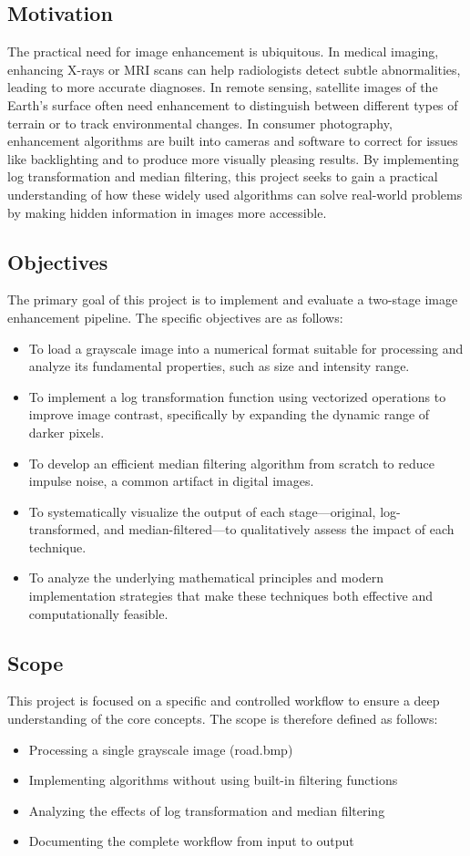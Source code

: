 \documentclass[12pt,a4paper]{article}
\begin{document}
\subsection{Motivation}
The practical need for image enhancement is ubiquitous. In medical imaging, enhancing X-rays or MRI scans can help radiologists detect subtle abnormalities, leading to more accurate diagnoses. In remote sensing, satellite images of the Earth's surface often need enhancement to distinguish between different types of terrain or to track environmental changes. In consumer photography, enhancement algorithms are built into cameras and software to correct for issues like backlighting and to produce more visually pleasing results. By implementing log transformation and median filtering, this project seeks to gain a practical understanding of how these widely used algorithms can solve real-world problems by making hidden information in images more accessible.


\subsection{Objectives}
The primary goal of this project is to implement and evaluate a two-stage image enhancement pipeline. The specific objectives are as follows:
\begin{itemize}
    \item To load a grayscale image into a numerical format suitable for processing and analyze its fundamental properties, such as size and intensity range.
    \item To implement a log transformation function using vectorized operations to improve image contrast, specifically by expanding the dynamic range of darker pixels.
    \item To develop an efficient median filtering algorithm from scratch to reduce impulse noise, a common artifact in digital images.
    \item To systematically visualize the output of each stage—original, log-transformed, and median-filtered—to qualitatively assess the impact of each technique.
    \item To analyze the underlying mathematical principles and modern implementation strategies that make these techniques both effective and computationally feasible.
\end{itemize}

\subsection{Scope}
This project is focused on a specific and controlled workflow to ensure a deep understanding of the core concepts. The scope is therefore defined as follows:
\begin{itemize}
    \item Processing a single grayscale image (road.bmp)
    \item Implementing algorithms without using built-in filtering functions
    \item Analyzing the effects of log transformation and median filtering
    \item Documenting the complete workflow from input to output
\end{itemize}
\end{document}
